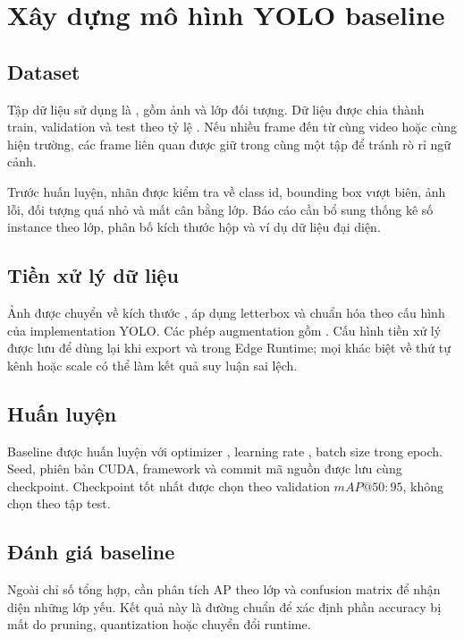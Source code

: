 \section{Xây dựng mô hình YOLO baseline}

\subsection{Dataset}

Tập dữ liệu sử dụng là , gồm  ảnh và
 lớp đối tượng. Dữ liệu được chia thành train, validation và test theo
tỷ lệ . Nếu nhiều frame đến từ cùng video hoặc cùng hiện trường,
các frame liên quan được giữ trong cùng một tập để tránh rò rỉ ngữ cảnh.

Trước huấn luyện, nhãn được kiểm tra về class id, bounding box vượt biên, ảnh lỗi,
đối tượng quá nhỏ và mất cân bằng lớp. Báo cáo cần bổ sung thống kê số instance
theo lớp, phân bố kích thước hộp và ví dụ dữ liệu đại diện.

\subsection{Tiền xử lý dữ liệu}

Ảnh được chuyển về kích thước , áp dụng letterbox và chuẩn hóa
theo cấu hình của implementation YOLO. Các phép augmentation gồm
. Cấu hình tiền xử lý được lưu để dùng lại khi
export và trong Edge Runtime; mọi khác biệt về thứ tự kênh hoặc scale có thể làm
kết quả suy luận sai lệch.

\subsection{Huấn luyện}

Baseline được huấn luyện với optimizer , learning rate
, batch size  trong  epoch. Seed, phiên
bản CUDA, framework và commit mã nguồn được lưu cùng checkpoint. Checkpoint
tốt nhất được chọn theo validation $mAP@50{:}95$, không chọn theo tập test.

\subsection{Đánh giá baseline}

\begin{table}[H]
\centering
\caption{Kết quả chất lượng của mô hình baseline}
\label{tab:baseline-quality}
\end{table}

Ngoài chỉ số tổng hợp, cần phân tích AP theo lớp và confusion matrix để nhận diện
những lớp yếu. Kết quả này là đường chuẩn để xác định phần accuracy bị mất do
pruning, quantization hoặc chuyển đổi runtime.